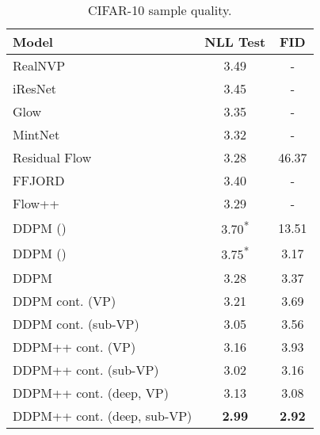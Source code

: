 \documentclass{article} \usepackage{iclr2021_conference,times}
\begin{document}
\begin{table}
\begin{minipage}[t]{0.48\textwidth}
\vspace{-0.3cm}
\begin{table}[H]
\centering
\caption{NLLs and FIDs (ODE) on CIFAR-10. }\label{tab:bpd}\vspace{-1em}
\footnotesize
 \setlength\tabcolsep{3.5pt}
\begin{adjustbox}{max width=\textwidth}
    \begin{tabular}{l c c}
    \toprule
    Model & NLL Test  & FID \\
    \midrule
    RealNVP~\citep{dinh2016density} & 3.49 & -\\
    iResNet~\citep{behrmann2019invertible} & 3.45 & -\\
    Glow~\citep{kingma2018glow} & 3.35 & - \\
    MintNet~\citep{song2019mintnet} & 3.32 & - \\
    Residual Flow~\citep{chen2019residual} & 3.28 & 46.37\\
    FFJORD~\citep{grathwohl2018ffjord} & 3.40 & -\\
    Flow++~\citep{ho2019flow++} & 3.29 & -\\
    DDPM ()~\citep{ho2020denoising} &  3.70\textsuperscript{*} & 13.51\\
    DDPM ()~\citep{ho2020denoising} &  3.75\textsuperscript{*} & 3.17\\
    \midrule
    DDPM & 3.28 & 3.37\\\relax
    DDPM cont. (VP) & 3.21 & 3.69\\\relax
    DDPM cont. (sub-VP) & 3.05 & 3.56\\\relax
    DDPM++ cont. (VP) & 3.16 & 3.93\\\relax
    DDPM++ cont. (sub-VP) & 3.02 & 3.16\\ \relax
    DDPM++ cont. (deep, VP) & 3.13 & 3.08\\ \relax
    DDPM++ cont. (deep, sub-VP) & \textbf{2.99} & \textbf{2.92} \\
    \bottomrule
    \end{tabular}
\end{adjustbox}
\end{table}
\end{minipage}\hfil
\begin{minipage}[t]{0.48\textwidth}
\vspace{-0.3cm}
\begin{table}[H]
\centering
\caption{CIFAR-10 sample quality.}\label{tab:fid}\vspace{-1em}

\end{table}
\end{minipage}
\end{table}
\end{document}
